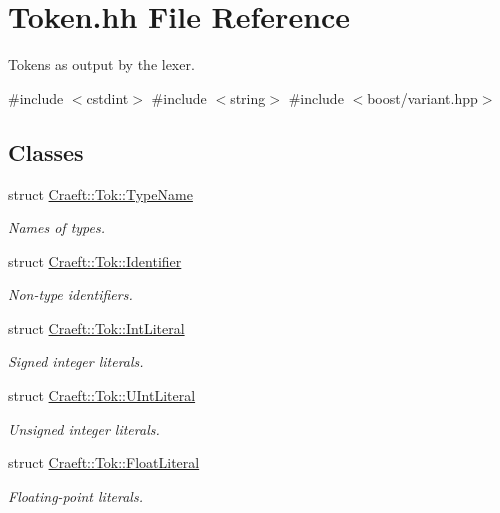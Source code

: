 \hypertarget{_token_8hh}{}\section{Token.\+hh File Reference}
\label{_token_8hh}


Tokens as output by the lexer.  


{\ttfamily \#include $<$cstdint$>$}\newline
{\ttfamily \#include $<$string$>$}\newline
{\ttfamily \#include $<$boost/variant.\+hpp$>$}\newline
\subsection*{Classes}
\begin{DoxyCompactItemize}
\item 
struct \hyperlink{struct_craeft_1_1_tok_1_1_type_name}{Craeft\+::\+Tok\+::\+Type\+Name}
\begin{DoxyCompactList}\small\item\em Names of types. \end{DoxyCompactList}\item 
struct \hyperlink{struct_craeft_1_1_tok_1_1_identifier}{Craeft\+::\+Tok\+::\+Identifier}
\begin{DoxyCompactList}\small\item\em Non-\/type identifiers. \end{DoxyCompactList}\item 
struct \hyperlink{struct_craeft_1_1_tok_1_1_int_literal}{Craeft\+::\+Tok\+::\+Int\+Literal}
\begin{DoxyCompactList}\small\item\em Signed integer literals. \end{DoxyCompactList}\item 
struct \hyperlink{struct_craeft_1_1_tok_1_1_u_int_literal}{Craeft\+::\+Tok\+::\+U\+Int\+Literal}
\begin{DoxyCompactList}\small\item\em Unsigned integer literals. \end{DoxyCompactList}\item 
struct \hyperlink{struct_craeft_1_1_tok_1_1_float_literal}{Craeft\+::\+Tok\+::\+Float\+Literal}
\begin{DoxyCompactList}\small\item\em Floating-\/point literals. \end{DoxyCompactList}\item 

\end{DoxyCompactItemize}
